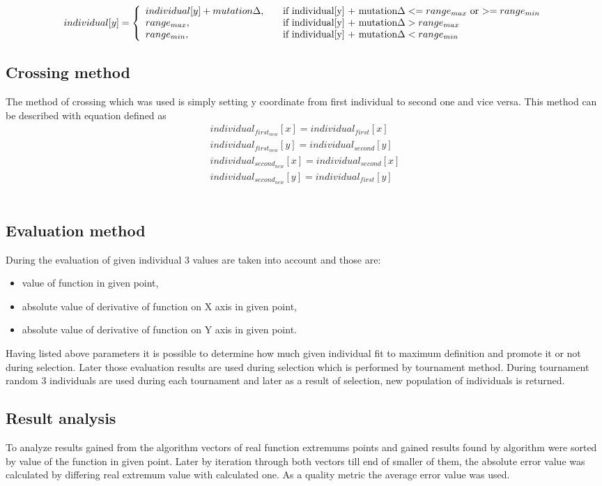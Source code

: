 \documentclass[a4paper]{article}
\begin{document}
\[ individual[y] = \left
\{\begin{array}{l l}
    individual[y] + mutation\Delta, & \quad \text{if individual[y] + mutation$\Delta <= range_{max}$ or $>= range_{min}$}\\
    range_{max}, & \quad \text{if individual[y] + mutation$\Delta > range_{max}$}\\
    range_{min}, & \quad \text{if individual[y] + mutation$\Delta < range_{min}$}
  \end{array} \right.\]

\subsection{Crossing method}
The method of crossing which was used is simply setting y coordinate from first individual to second one and vice versa. This method can be described with equation defined as \\
\[
\begin{array}{l}
individual_{first_{new}}[x] = individual_{first}[x]\\
individual_{first_{new}}[y] = individual_{second}[y]\\
individual_{second_{new}}[x] = individual_{second}[x]\\
individual_{second_{new}}[y] = individual_{first}[y]
\end{array}\]\\
\subsection{Evaluation method}
During the evaluation of given individual 3 values are taken into account and those are:
\begin{itemize}
 \item{value of function in given point,}
 \item{absolute value of derivative of function on X axis in given point,}
 \item{absolute value of derivative of function on Y axis in given point.}
\end{itemize}
Having listed above parameters it is possible to determine how much given individual fit to maximum definition and promote it or not during selection. 
Later those evaluation results are used during selection which is performed by tournament method. During tournament random 3 individuals are used during 
each tournament and later as a result of selection, new population of individuals is returned.
\subsection{Result analysis}
To analyze results gained from the algorithm vectors of real function extremums points and gained results found by algorithm were sorted by value of the function in given point.
Later by iteration through both vectors till end of smaller of them, the absolute error value was calculated by differing real extremum value with calculated one. As a quality 
metric the average error value was used.
\end{document}
